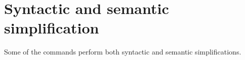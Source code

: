 \section{Syntactic and semantic simplification}

Some of the commands perform both syntactic and semantic simplifications.
